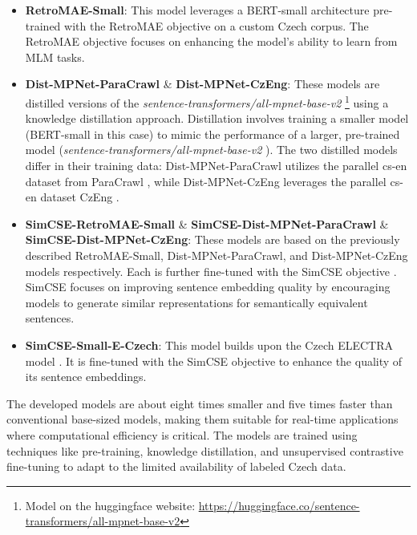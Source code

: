\begin{itemize}
  \item \textbf{RetroMAE-Small}:
    This model leverages a \ac{BERT}-small architecture pre-trained with the \ac{RetroMAE} objective \cite{RetroMAE} on a custom Czech corpus.
    The \ac{RetroMAE} objective focuses on enhancing the model's ability to learn from \ac{MLM} tasks.
  \item \textbf{Dist-MPNet-ParaCrawl} \& \textbf{Dist-MPNet-CzEng}:
    These models are distilled versions of the \textit{sentence-transformers/all-mpnet-base-v2} \footnote{\label{hf_all-mpnet-base-v2} Model on the huggingface website: \url{https://huggingface.co/sentence-transformers/all-mpnet-base-v2}} using a knowledge distillation approach.
    Distillation involves training a smaller model (\ac{BERT}-small in this case) to mimic the performance of a larger, pre-trained model (\textit{sentence-transformers/all-mpnet-base-v2} ).
    The two distilled models differ in their training data: Dist-MPNet-ParaCrawl utilizes the parallel cs-en dataset from ParaCrawl \cite{ParaCrawl}, while Dist-MPNet-CzEng leverages the parallel cs-en dataset CzEng \cite{CzEng_dataset}.
  \item \textbf{SimCSE-RetroMAE-Small} \& \textbf{SimCSE-Dist-MPNet-ParaCrawl} \& \textbf{SimCSE-Dist-MPNet-CzEng}:
    These models are based on the previously described RetroMAE-Small, Dist-MPNet-ParaCrawl, and Dist-MPNet-CzEng models respectively.
    Each is further fine-tuned with the \ac{SimCSE} objective \cite{SimCSE}.
    \ac{SimCSE} focuses on improving sentence embedding quality by encouraging models to generate similar representations for semantically equivalent sentences.
  \item \textbf{SimCSE-Small-E-Czech}:
    This model builds upon the Czech ELECTRA model \cite{small-e-czech}.
    It is fine-tuned with the \ac{SimCSE} \cite{SimCSE} objective to enhance the quality of its sentence embeddings.    
\end{itemize}

The developed models are about eight times smaller and five times faster than conventional base-sized models, making them suitable for real-time applications where computational efficiency is critical.
The models are trained using techniques like pre-training, knowledge distillation, and unsupervised contrastive fine-tuning to adapt to the limited availability of labeled Czech data.


